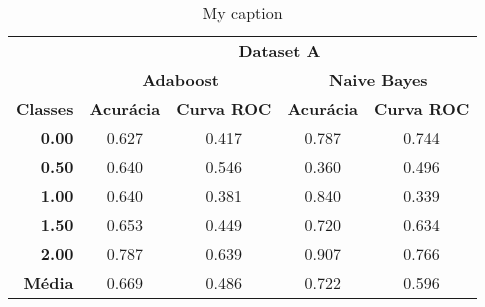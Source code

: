 \begin{table}[H]
\centering
\begin{tabular}{r|c|c|c|c|}
\cline{2-5}
\multicolumn{1}{c|}{}                  & \multicolumn{4}{c|}{\textbf{Dataset A}}                                            \\ \cline{2-5} 
\multicolumn{1}{l|}{}                  & \multicolumn{2}{c|}{\textbf{Adaboost}} & \multicolumn{2}{c|}{\textbf{Naive Bayes}} \\ \hline
\multicolumn{1}{|c|}{\textbf{Classes}} & \textbf{Acurácia} & \textbf{Curva ROC} & \textbf{Acurácia}   & \textbf{Curva ROC}  \\ \hline
\multicolumn{1}{|r|}{\textbf{0.00}}    & 0.627             & 0.417              & 0.787               & 0.744                \\ \hline
\multicolumn{1}{|r|}{\textbf{0.50}}    & 0.640             & 0.546              & 0.360               & 0.496                \\ \hline
\multicolumn{1}{|r|}{\textbf{1.00}}    & 0.640             & 0.381              & 0.840               & 0.339               \\ \hline
\multicolumn{1}{|r|}{\textbf{1.50}}    & 0.653             & 0.449              & 0.720               & 0.634               \\ \hline
\multicolumn{1}{|r|}{\textbf{2.00}}    & 0.787             & 0.639              & 0.907               & 0.766               \\ \hline
\multicolumn{1}{|r|}{\textbf{Média}}   & 0.669             & 0.486              & 0.722               & 0.596               \\ \hline
\end{tabular}
\caption{My caption}
\label{table:evaluation_result_a}
\end{table}

